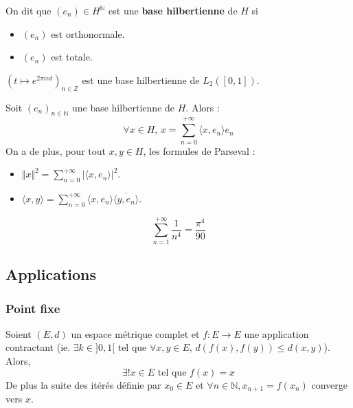 	\begin{definition}
		On dit que $(e_n) \in H^{\mathbb{N}}$ est une \textbf{base hilbertienne} de $H$ si
		\begin{itemize}
			\item $(e_n)$ est orthonormale.
			\item $(e_n)$ est totale.
		\end{itemize}
	\end{definition}

	\begin{example}
		$(t \mapsto e^{2\pi int})_{n \in \mathbb{Z}}$ est une base hilbertienne de $L_2([0,1])$.
	\end{example}

	\begin{theorem}
		Soit $(e_n)_{n \in \mathbb{N}}$ une base hilbertienne de $H$. Alors :
		\[ \forall x \in H, \, x = \sum_{n=0}^{+\infty} \langle x, e_n \rangle e_n \]
		On a de plus, pour tout $x, y \in H$, les formules de Parseval :
		\begin{itemize}
			\item $\Vert x \Vert^2 = \sum_{n=0}^{+\infty} \vert \langle x, e_n \rangle \vert^2$.
			\item $\langle x, y \rangle = \sum_{n=0}^{+\infty} \langle x, e_n \rangle \overline{\langle y, e_n \rangle}$.
		\end{itemize}
	\end{theorem}


	\begin{application}
		\[ \sum_{n = 1}^{+\infty} \frac{1}{n^4} = \frac{\pi^4}{90} \]
	\end{application}

	\subsection{Applications}

	\subsubsection{Point fixe}


	\begin{theorem}
		Soient $(E,d)$ un espace métrique complet et $f : E \rightarrow E$ une application contractant (ie. $\exists k \in ]0,1[ \text{ tel que } \forall x, y \in E, \, d(f(x), f(y)) \leq d(x, y)$). Alors,
		\[ \exists! x \in E \text{ tel que } f(x) = x \]
		De plus la suite des itérés définie par $x_0 \in E$ et $\forall n \in \mathbb{N}, x_{n+1} = f(x_n)$ converge vers $x$.
	\end{theorem}

